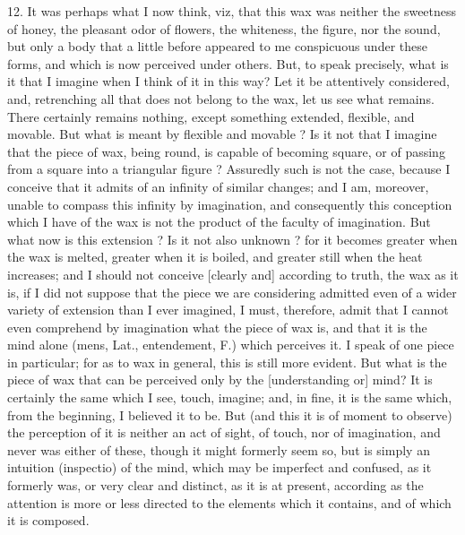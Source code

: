12. It was perhaps what I now think, viz, that this wax was neither the sweetness of honey, the pleasant odor of flowers, the whiteness, the figure, nor the sound, but only a body that a little before appeared to me conspicuous under these forms, and which is now perceived under others. But, to speak precisely, what is it that I imagine when I think of it in this way? Let it be attentively considered, and, retrenching all that does not belong to the wax, let us see what remains. There certainly remains nothing, except something extended, flexible, and movable. But what is meant by flexible and movable ? Is it not that I imagine that the piece of wax, being round, is capable of becoming square, or of passing from a square into a triangular figure ? Assuredly such is not the case, because I conceive that it admits of an infinity of similar changes; and I am, moreover, unable to compass this infinity by imagination, and consequently this conception which I have of the wax is not the product of the faculty of imagination. But what now is this extension ? Is it not also unknown ? for it becomes greater when the wax is melted, greater when it is boiled, and greater still when the heat increases; and I should not conceive [clearly and] according to truth, the wax as it is, if I did not suppose that the piece we are considering admitted even of a wider variety of extension than I ever imagined, I must, therefore, admit that I cannot even comprehend by imagination what the piece of wax is, and that it is the mind alone (mens, Lat., entendement, F.) which perceives it. I speak of one piece in particular; for as to wax in general, this is still more evident. But what is the piece of wax that can be perceived only by the [understanding or] mind? It is certainly the same which I see, touch, imagine; and, in fine, it is the same which, from the beginning, I believed it to be. But (and this it is of moment to observe) the perception of it is neither an act of sight, of touch, nor of imagination, and never was either of these, though it might formerly seem so, but is simply an intuition (inspectio) of the mind, which may be imperfect and confused, as it formerly was, or very clear and distinct, as it is at present, according as the attention is more or less directed to the elements which it contains, and of which it is composed.

